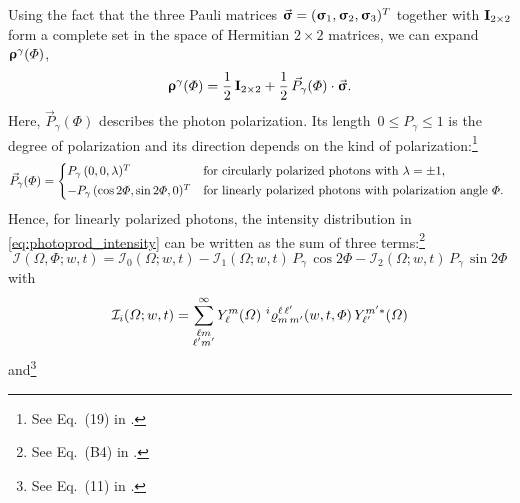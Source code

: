 Using the fact that the three Pauli matrices $\vec{\bm{\mathrm{\upsigma}}} =
(\bm{\mathrm{\upsigma}}_1, \bm{\mathrm{\upsigma}}_2, \bm{\mathrm{\upsigma}}_3)^T$ together
with $\bm{\mathrm{I}}_{2 \times 2}$ form a complete set in the space of
Hermitian $2 \times 2$ matrices, we can expand
$\bm{\mathrm{\upvarrho}}^\gamma(\Phi)$, \ie
\begin{equation}
  \bm{\mathrm{\upvarrho}}^\gamma(\Phi)
  = \frac{1}{2}\, \bm{\mathrm{I}}_{2 \times 2} + \frac{1}{2}\, \vec{P}_\gamma(\Phi) \cdot \vec{\bm{\mathrm{\upsigma}}}.
\end{equation}
Here, $\vec{P}_\gamma(\Phi)$ describes the photon polarization.  Its
length~$0 \leq P_\gamma \leq 1$ is the degree of polarization and its
direction depends on the kind of polarization:\footnote{See Eq.~(19)
in .}
\begin{equation}
  \vec{P}_\gamma(\Phi)
  = \begin{cases*}
    P_\gamma\, (0, 0, \lambda)^T                & for circularly polarized photons with $\lambda = \pm 1$, \\
    -P_\gamma\, (\cos 2 \Phi, \sin 2 \Phi, 0)^T & for linearly polarized photons with polarization angle~$\Phi$.
  \end{cases*}
\end{equation}
Hence, for linearly polarized photons, the intensity distribution in
\cref{eq:photoprod_intensity} can be written as the sum of three
terms:\footnote{See Eq.~(B4) in .}
\begin{equation}
  \mathcal{I}(\Omega, \Phi; w, t)
  = \mathcal{I}_0(\Omega; w, t)
  - \mathcal{I}_1(\Omega; w, t)\, P_\gamma\, \cos 2 \Phi
  - \mathcal{I}_2(\Omega; w, t)\, P_\gamma\, \sin 2 \Phi
\end{equation}
with
\begin{equation}
  \mathcal{I}_i(\Omega; w, t)
  = \sum_{\substack{\ell m \\ \ell' m'}}^\infty
  Y_\ell^m(\Omega)\,
  \prescript{i}{}{\varrho}^{\ell\, \ell'}_{m\, m'}(w, t, \Phi)\,
  Y_{\ell'}^{m' *}(\Omega)
\end{equation}
and\footnote{See Eq.~(11) in .}
